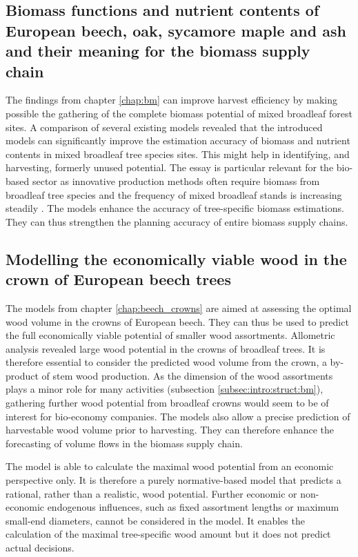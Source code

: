 \subsection{Biomass functions and nutrient contents of European beech, oak, sycamore maple and ash and their meaning for the biomass supply chain}
\label{subsec:discussion:struct:bm}
The findings from chapter \ref{chap:bm} can improve harvest efficiency by making possible the gathering of the complete biomass potential of mixed broadleaf forest sites. A comparison of several existing models revealed that the introduced models can significantly improve the estimation accuracy of biomass and nutrient contents in mixed broadleaf tree species sites. This might help in identifying, and harvesting, formerly unused potential. The essay is particular relevant for the bio-based sector as innovative production methods often require biomass from broadleaf tree species \citep[p. 1]{auer_2016} and the frequency of mixed broadleaf stands is increasing steadily \citep{ti_2014}. The models enhance the accuracy of tree-specific biomass estimations. They can thus strengthen the planning accuracy of entire biomass supply chains.

\subsection{Modelling the economically viable wood in the crown of European beech trees}
\label{subsec:discussion:struct:beech_crowns}
The models from chapter \ref{chap:beech_crowns} are aimed at assessing the optimal wood volume in the crowns of European beech. They can thus be used to predict the full economically viable potential of smaller wood assortments. Allometric analysis revealed large wood potential in the crowns of broadleaf trees. It is therefore essential to consider the predicted wood volume from the crown, a by-product of stem wood production. As the dimension of the wood assortments plays a minor role for many activities (subsection \ref{subsec:intro:struct:bm}), gathering further wood potential from broadleaf crowns would seem to be of interest for bio-economy companies. The models also allow a precise prediction of harvestable wood volume prior to harvesting. They can therefore enhance the forecasting of volume flows in the biomass supply chain.

The model is able to calculate the maximal wood potential from an economic perspective only. It is therefore a purely normative-based model that predicts a rational, rather than a realistic, wood potential. Further economic or non-economic endogenous influences, such as fixed assortment lengths or maximum small-end diameters, cannot be considered in the model. It enables the calculation of the maximal tree-specific wood amount but it does not predict actual decisions.

